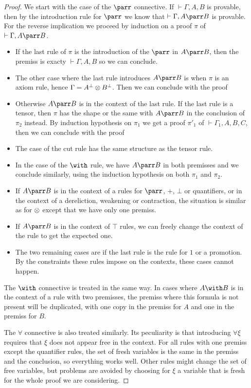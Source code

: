 \begin{proof}
We start with the case of the $\parr$ connective.
If $\vdash\Gamma,A,B$ is provable, then by the introduction rule for $\parr$
we know that $\vdash\Gamma,A\parr B$ is provable.
For the reverse implication we proceed by induction on a proof $\pi$ of
$\vdash\Gamma,A\parr B$.
\begin{itemize}
\item If the last rule of $\pi$ is the introduction of the $\parr$ in $A\parr B$, then the premiss is exacty $\vdash\Gamma,A,B$ so we can conclude.
\item The other case where the last rule introduces $A\parr B$ is when $\pi$ is an axiom rule, hence $\Gamma=A^\bot\otimes B^\bot$. Then we can conclude with the proof
\item Otherwise $A\parr B$ is in the context of the last rule. If the last rule is a tensor, then $\pi$ has the shape
or the same with $A\parr B$ in the conclusion of $\pi_2$ instead. By induction hypothesis on $\pi_1$ we get a proof $\pi'_1$ of $\vdash\Gamma_1,A,B,C$, then we can conclude with the proof
\item The case of the cut rule has the same structure as the tensor rule.
\item In the case of the $\with$ rule, we have $A\parr B$ in both premisses and we conclude similarly, using the induction hypothesis on both $\pi_1$ and $\pi_2$.
\item If $A\parr B$ is in the context of a rules for $\parr$, $\plus$, $\bot$ or quantifiers, or in the context of a dereliction, weakening or contraction, the situation is similar as for $\otimes$ except that we have only one premiss.
\item If $A\parr B$ is in the context of $\top$ rules, we can freely change the context of the rule to get the expected one.
\item The two remaining cases are if the last rule is the rule for $1$ or a promotion. By the constraints these rules impose on the contexts, these cases cannot happen.
\end{itemize}
The $\with$ connective is treated in the same way.
In cases where $A\with B$ is in the context of a rule with two
premisses, the premiss where this formula is not present will be duplicated,
with one copy in the premiss for $A$ and one in the premiss for $B$.

The $\forall$ connective is also treated similarly.
Its peculiarity is that introducing $\forall\xi$ requires that $\xi$ does
not appear free in the context.
For all rules with one premiss except the quantifier rules, the set of fresh
variables is the same in the premiss and the conclusion, so everything works
well.
Other rules might change the set of free variables, but problems are avoided
by choosing for $\xi$ a variable that is fresh for the whole proof we are considering.
\end{proof}

